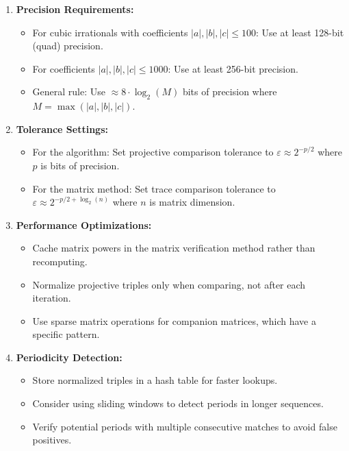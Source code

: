 \begin{enumerate}
    \item \textbf{Precision Requirements:} 
    \begin{itemize}
        \item For cubic irrationals with coefficients $|a|, |b|, |c| \leq 100$: Use at least 128-bit (quad) precision.
        \item For coefficients $|a|, |b|, |c| \leq 1000$: Use at least 256-bit precision.
        \item General rule: Use $\approx 8 \cdot \log_2(M)$ bits of precision where $M = \max(|a|, |b|, |c|)$.
    \end{itemize}
    
    \item \textbf{Tolerance Settings:}
    \begin{itemize}
        \item For the \HAPD{} algorithm: Set projective comparison tolerance to $\varepsilon \approx 2^{-p/2}$ where $p$ is bits of precision.
        \item For the matrix method: Set trace comparison tolerance to $\varepsilon \approx 2^{-p/2+\log_2(n)}$ where $n$ is matrix dimension.
    \end{itemize}
    
    \item \textbf{Performance Optimizations:}
    \begin{itemize}
        \item Cache matrix powers in the matrix verification method rather than recomputing.
        \item Normalize projective triples only when comparing, not after each iteration.
        \item Use sparse matrix operations for companion matrices, which have a specific pattern.
    \end{itemize}
    
    \item \textbf{Periodicity Detection:}
    \begin{itemize}
        \item Store normalized triples in a hash table for faster lookups.
        \item Consider using sliding windows to detect periods in longer sequences.
        \item Verify potential periods with multiple consecutive matches to avoid false positives.
    \end{itemize}
\end{enumerate}

